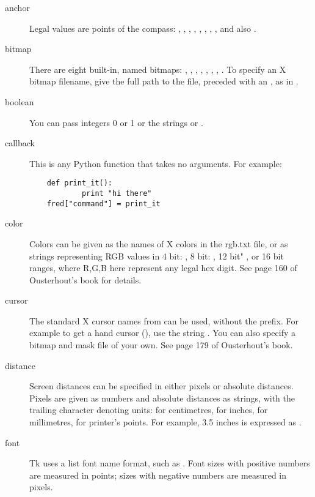 \begin{description}
\item[anchor]
Legal values are points of the compass: ,
, , , ,
, , , and also
.

\item[bitmap]
There are eight built-in, named bitmaps: , ,
, , , ,
, .  To specify an X bitmap
filename, give the full path to the file, preceded with an ,
as in .

\item[boolean]
You can pass integers 0 or 1 or the strings  or  .

\item[callback]
This is any Python function that takes no arguments.  For example: 
\begin{verbatim}
    def print_it():
            print "hi there"
    fred["command"] = print_it
\end{verbatim}

\item[color]
Colors can be given as the names of X colors in the rgb.txt file,
or as strings representing RGB values in 4 bit: , 8
bit: , 12 bit" , or 16 bit
 ranges, where R,G,B here represent any
legal hex digit.  See page 160 of Ousterhout's book for details.  

\item[cursor]
The standard X cursor names from  can be used,
without the  prefix.  For example to get a hand cursor
(), use the string .  You can also
specify a bitmap and mask file of your own.  See page 179 of
Ousterhout's book.

\item[distance]
Screen distances can be specified in either pixels or absolute
distances.  Pixels are given as numbers and absolute distances as
strings, with the trailing character denoting units: 
for centimetres,  for inches,  for millimetres,
 for printer's points.  For example, 3.5 inches is expressed
as .

\item[font]
Tk uses a list font name format, such as .
Font sizes with positive numbers are measured in points;
sizes with negative numbers are measured in pixels.


\end{description}
